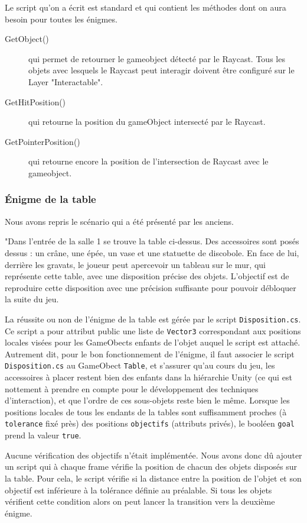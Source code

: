 \documentclass[12pt]{article}
\begin{document}
Le script qu’on a écrit est standard et qui contient les méthodes dont on aura besoin pour toutes les énigmes.

\begin{description}
    \item[GetObject()] qui permet de retourner le gameobject détecté par le Raycast. Tous les objets avec lesquels le Raycast peut interagir doivent être configuré sur le Layer "Interactable".
    \item[GetHitPosition()] qui retourne la position du gameObject intersecté par le Raycast.
    \item[GetPointerPosition()] qui retourne encore la position de l’intersection de Raycast avec le gameobject.
\end{description}
\subsubsection{Énigme de la table}
Nous avons repris le scénario qui a été présenté par les anciens.

\begin{quoting}
    "Dans l’entrée de la salle 1 se trouve la table ci-dessus. Des accessoires sont posés dessus : un crâne, une épée, un vase et une statuette de discobole. En face de lui, derrière les gravats, le joueur peut apercevoir un tableau sur le mur, qui représente cette table, avec une disposition précise des objets. L’objectif est de reproduire cette disposition avec une précision suffisante pour pouvoir débloquer la suite du jeu.

    La réussite ou non de l'énigme de la table est gérée par le script \verb!Disposition.cs!. Ce script a pour attribut public une liste de \verb!Vector3! correspondant aux positions locales visées pour les GameObects enfants de l'objet auquel le script est attaché. Autrement dit, pour le bon fonctionnement de l'énigme, il faut associer le script \verb!Disposition.cs! au GameObect \verb!Table!, et s'assurer qu'au cours du jeu, les accessoires à placer restent bien des enfants dans la hiérarchie Unity (ce qui est nottement à prendre en compte pour le développement des techniques d'interaction), et que l'ordre de ces sous-objets reste bien le même. Lorsque les positions locales de tous les endants de la tables sont suffisamment proches (à \verb!tolerance! fixé près) des positions \verb!objectifs! (attributs privés), le booléen \verb!goal! prend la valeur \verb!true!.
\end{quoting}

Aucune vérification des objectifs n’était implémentée. Nous avons donc dû ajouter un script qui à chaque frame vérifie la position de chacun des objets disposés sur la table. Pour cela, le script vérifie si la distance entre la position de l’objet et son objectif est inférieure à la tolérance définie au préalable. Si tous les objets vérifient cette condition alors on peut lancer la transition vers la deuxième énigme.
\end{document}
